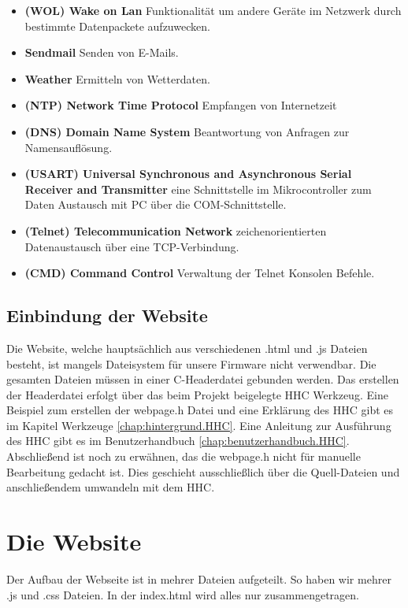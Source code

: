 \begin{itemize}
  \item \textbf{(WOL) Wake on Lan} Funktionalität um andere Geräte im Netzwerk
  durch bestimmte Datenpackete aufzuwecken.
  \item \textbf{Sendmail} Senden von E-Mails.
  \item \textbf{Weather} Ermitteln von Wetterdaten.
  \item \textbf{(NTP) Network Time Protocol} Empfangen von Internetzeit
  \item \textbf{(DNS) Domain Name System} Beantwortung von Anfragen zur
  Namensauflösung.
  \item \textbf{(USART) Universal Synchronous and Asynchronous Serial Receiver and
  Transmitter} eine Schnittstelle im Mikrocontroller zum Daten
  Austausch mit PC über die COM-Schnittstelle.
  \item \textbf{(Telnet) Telecommunication Network} zeichenorientierten
  Datenaustausch über eine TCP-Verbindung.
  \item \textbf{(CMD) Command Control} Verwaltung der Telnet Konsolen Befehle.
\end{itemize}

\subsection{Einbindung der Website}

Die Website, welche hauptsächlich aus verschiedenen .html und .js Dateien
besteht, ist mangels Dateisystem für unsere Firmware nicht verwendbar. Die
gesamten Dateien müssen in einer C-Headerdatei gebunden werden.
Das erstellen der Headerdatei erfolgt über das beim Projekt beigelegte
\ac{HHC} Werkzeug. Eine Beispiel zum erstellen der \textrm{webpage.h} 
Datei und eine Erklärung des \ac{HHC} gibt es im Kapitel Werkzeuge
\ref{chap:hintergrund.HHC}. Eine Anleitung zur Ausführung des \ac{HHC} gibt es im
Benutzerhandbuch \ref{chap:benutzerhandbuch.HHC}.
Abschließend ist noch zu erwähnen, das die \textrm{webpage.h} nicht für manuelle
Bearbeitung gedacht ist. Dies geschieht ausschließlich über die Quell-Dateien
und anschließendem umwandeln mit dem \ac{HHC}.

\section{Die Website}

Der Aufbau der Webseite ist in mehrer Dateien aufgeteilt. So haben wir mehrer
.js und .css Dateien. In der index.html wird alles nur zusammengetragen.
\newline

